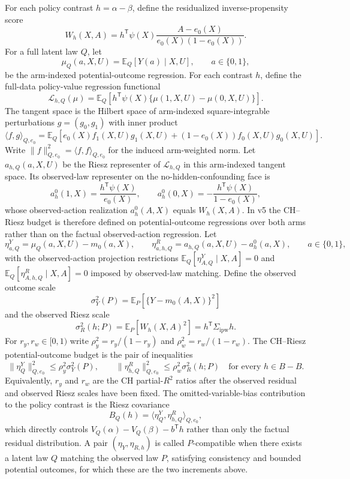 \documentclass[11pt]{article}
\newcommand{\E}{\mathbb{E}}
\newcommand{\transpose}{\mathsf{T}}
\theoremstyle{definition}
\theoremstyle{plain}
\theoremstyle{remark}
\begin{document}
For each policy contrast $h=\alpha-\beta$, define the residualized inverse-propensity score
\[
  W_h(X,A)=h^\transpose\psi(X)\frac{A-e_0(X)}{e_0(X)(1-e_0(X))}.
\]
For a full latent law $Q$, let
\[
  \mu_Q(a,X,U)=\E_Q[Y(a)\mid X,U],\qquad a\in\{0,1\},
\]
be the arm-indexed potential-outcome regression. For each contrast $h$, define the full-data policy-value regression functional
\[
  \mathcal L_{h,Q}(\mu)=
  \E_Q\!\left[h^\transpose\psi(X)\{\mu(1,X,U)-\mu(0,X,U)\}\right].
\]
The tangent space is the Hilbert space of arm-indexed square-integrable perturbations
$g=(g_0,g_1)$ with inner product
\[
  \langle f,g\rangle_{Q,e_0}
  =
  \E_Q\!\left[
    e_0(X)f_1(X,U)g_1(X,U)
    +(1-e_0(X))f_0(X,U)g_0(X,U)
  \right].
\]
Write $\|f\|_{Q,e_0}^2=\langle f,f\rangle_{Q,e_0}$ for the induced arm-weighted norm.
Let $a_{h,Q}(a,X,U)$ be the Riesz representer of $\mathcal L_{h,Q}$ in this arm-indexed tangent space. Its observed-law representer on the no-hidden-confounding face is
\[
  a^0_h(1,X)=\frac{h^\transpose\psi(X)}{e_0(X)},\qquad
  a^0_h(0,X)=-\frac{h^\transpose\psi(X)}{1-e_0(X)},
\]
whose observed-action realization $a^0_h(A,X)$ equals $W_h(X,A)$. In v5 the CH--Riesz budget is therefore defined on potential-outcome regressions over both arms rather than on the factual observed-action regression. Let
\[
  \eta^Y_{a,Q}=\mu_Q(a,X,U)-m_0(a,X),\qquad
  \eta^R_{a,h,Q}=a_{h,Q}(a,X,U)-a^0_h(a,X),
  \qquad a\in\{0,1\},
\]
with the observed-action projection restrictions
$\E_Q[\eta^Y_{A,Q}\mid X,A]=0$ and
$\E_Q[\eta^R_{A,h,Q}\mid X,A]=0$ imposed by observed-law matching. Define the observed outcome scale
\[
  \sigma_Y^2(P)=\E_P[\{Y-m_0(A,X)\}^2]
\]
and the observed Riesz scale
\[
  \sigma_R^2(h;P)=\E_P[W_h(X,A)^2]=h^\transpose\Sigma_{\mathrm{ipw}}h.
\]
For $r_y,r_w\in[0,1)$ write
$\rho_y^2=r_y/(1-r_y)$ and $\rho_w^2=r_w/(1-r_w)$. The CH--Riesz potential-outcome budget is the pair of inequalities
\[
  \|\eta^Y_Q\|_{Q,e_0}^2\le \rho_y^2\sigma_Y^2(P),\qquad
  \|\eta^R_{h,Q}\|_{Q,e_0}^2\le \rho_w^2\sigma_R^2(h;P)
  \quad\text{for every }h\in B-B.
\]
Equivalently, $r_y$ and $r_w$ are the CH partial-$R^2$ ratios after the observed residual and observed Riesz scales have been fixed. The omitted-variable-bias contribution to the policy contrast is the Riesz covariance
\[
  B_Q(h)=\langle \eta^Y_Q,\eta^R_{h,Q}\rangle_{Q,e_0},
\]
which directly controls $V_Q(\alpha)-V_Q(\beta)-b^\transpose h$ rather than only the factual residual distribution. A pair $(\eta_Y,\eta_{R,h})$ is called $P$-compatible when there exists a latent law $Q$ matching the observed law $P$, satisfying consistency and bounded potential outcomes, for which these are the two increments above.
\end{document}
